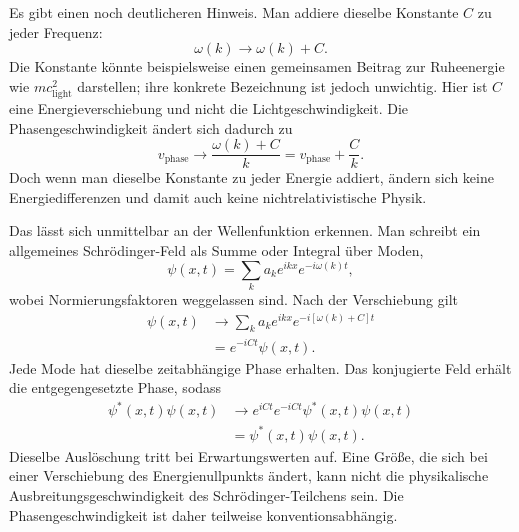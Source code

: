 Es gibt einen noch deutlicheren Hinweis. Man addiere dieselbe Konstante \(C\) zu jeder Frequenz:
\begin{equation}
\omega(k)\longrightarrow \omega(k)+C.
\end{equation}
Die Konstante könnte beispielsweise einen gemeinsamen Beitrag zur Ruheenergie wie \(mc_{\mathrm{light}}^2\) darstellen; ihre konkrete Bezeichnung ist jedoch unwichtig. Hier ist \(C\) eine Energieverschiebung und nicht die Lichtgeschwindigkeit. Die Phasengeschwindigkeit ändert sich dadurch zu
\begin{equation}
v_{\mathrm{phase}}\longrightarrow
\frac{\omega(k)+C}{k}
=v_{\mathrm{phase}}+\frac{C}{k}.
\end{equation}
Doch wenn man dieselbe Konstante zu jeder Energie addiert, ändern sich keine Energiedifferenzen und damit auch keine nichtrelativistische Physik.

Das lässt sich unmittelbar an der Wellenfunktion erkennen. Man schreibt ein allgemeines Schr\"odinger-Feld als Summe oder Integral über Moden,
\begin{equation}
\psi(x,t)=\sum_k a_k e^{ikx}e^{-i\omega(k)t},
\end{equation}
wobei Normierungsfaktoren weggelassen sind. Nach der Verschiebung gilt
\begin{align}
\psi(x,t)
&\longrightarrow
\sum_k a_k e^{ikx}e^{-i[\omega(k)+C]t}
\\
&=e^{-iCt}\psi(x,t).
\end{align}
Jede Mode hat dieselbe zeitabhängige Phase erhalten. Das konjugierte Feld erhält die entgegengesetzte Phase, sodass
\begin{equation}
\begin{aligned}
\psi^*(x,t)\psi(x,t)
&\longrightarrow
e^{iCt}e^{-iCt}\psi^*(x,t)\psi(x,t)
\\
&=\psi^*(x,t)\psi(x,t).
\end{aligned}
\end{equation}
Dieselbe Auslöschung tritt bei Erwartungswerten auf. Eine Größe, die sich bei einer Verschiebung des Energienullpunkts ändert, kann nicht die physikalische Ausbreitungsgeschwindigkeit des Schr\"odinger-Teilchens sein. Die Phasengeschwindigkeit ist daher teilweise konventionsabhängig.

